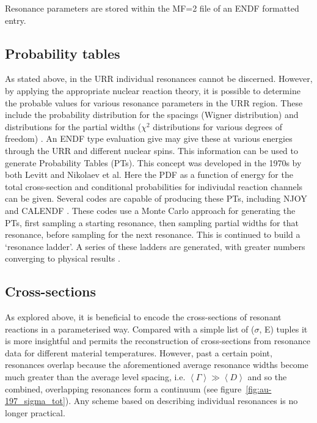 Resonance parameters are stored within the MF=2 file of an ENDF formatted entry. 

\subsection{Probability tables}
As stated above, in the URR individual resonances cannot be discerned. However, by applying the appropriate nuclear reaction theory, it is possible to determine the probable values for various resonance parameters in the URR region. These include the probability distribution for the spacings (Wigner distribution) and distributions for the partial widths ($\chi^{2}$ distributions for various degrees of freedom) \cite{MacFarlane2016}. An ENDF type evaluation give may give these at various energies through the URR and different nuclear spins. This information can be used to generate Probability Tables (PTs). This concept was developed in the 1970s by both Levitt and Nikolaev et al. Here the PDF as a function of energy for the total cross-section and conditional probabilities for indiviudal reaction channels can be given. Several codes are capable of producing these PTs, including NJOY \cite{MacFarlane2010} and CALENDF \cite{sublet2017b}. These codes use a Monte Carlo approach for generating the PTs, first sampling a starting resonance, then sampling partial widths for that resonance, before sampling for the next resonance. This is continued to build a `resonance ladder'. A series of these ladders are generated, with greater numbers converging to physical results \cite{Brown2017}.


\subsection{Cross-sections}
As explored above, it is beneficial to encode the cross-sections of resonant reactions in a parameterised way. Compared with a simple list of ($\sigma$, E) tuples it is more insightful and permits the reconstruction of cross-sections from resonance data for different material temperatures. However, past a certain point, resonances overlap because the aforementioned average resonance widths become much greater than the average level spacing, i.e. $\left<\Gamma\right> \gg \left<D\right>$ and so the combined, overlapping resonances form a continuum (see figure~\ref{fig:au-197_sigma_tot}). Any scheme based on describing individual resonances is no longer practical. 

